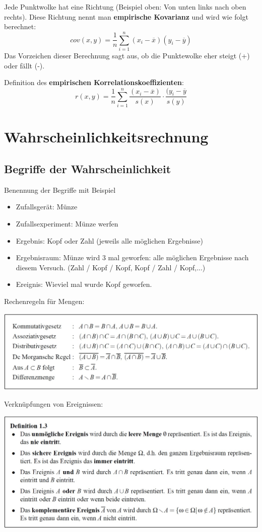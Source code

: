 \documentclass[12pt,a4paper]{article} %
\begin{document}
Jede Punktwolke hat eine Richtung (Beispiel oben:  Von unten links nach oben rechts). Diese Richtung nennt man \textbf{empirische Kovarianz} und wird wie folgt berechnet:
$$cov(x,y) = \frac{1}{n} \sum_{i=1}^n (x_i-\overline{x})(y_i-\overline{y})$$
Das Vorzeichen dieser Berechnung sagt aus, ob die Punktewolke eher steigt (+) oder fällt (-).
\pagebreak

Definition des \textbf{empirischen Korrelationskoeffizienten}:
$$r(x,y) = \frac{1}{n} \sum_{i=1}^n \frac{(x_i-\overline{x})}{s(x)}\cdot \frac{(y_i-\overline{y}}{s(y)}$$

\pagebreak

\section{Wahrscheinlichkeitsrechnung}

\subsection{Begriffe der Wahrscheinlichkeit}
Benennung der Begriffe mit Beispiel
\begin{itemize}
\item Zufallsgerät: Münze
\item Zufallsexperiment: Münze werfen
\item Ergebnis: Kopf oder Zahl (jeweils alle möglichen Ergebnisse)
\item Ergebnisraum: Münze wird 3 mal geworfen: alle möglichen Ergebnisse nach diesem Versuch. (Zahl / Kopf / Kopf, Kopf / Zahl / Kopf,...)
\item Ereignis: Wieviel mal wurde Kopf geworfen.
\end{itemize}
Rechenregeln für Mengen: 
\begin{center}
\includegraphics[scale=0.5]{rechenregeln.jpg}
\end{center}
Verknüpfungen von Ereignissen:
\begin{center}
\includegraphics[scale=0.5]{verkEreignisse.jpg}
\end{center}
\pagebreak
\end{document}
